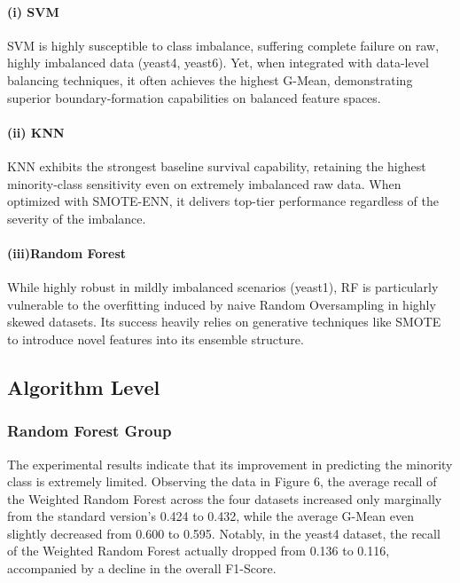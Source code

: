 \documentclass[sigconf]{acmart}
\begin{document}
\paragraph{(i) SVM}
SVM is highly susceptible to class imbalance, suffering complete failure on raw, highly imbalanced data (yeast4, yeast6). Yet, when integrated with data-level balancing techniques, it often achieves the highest G-Mean, demonstrating superior boundary-formation capabilities on balanced feature spaces. 

\paragraph{(ii) KNN}
KNN exhibits the strongest baseline survival capability, retaining the highest minority-class sensitivity even on extremely imbalanced raw data. When optimized with SMOTE-ENN, it delivers top-tier performance regardless of the severity of the imbalance. 

\paragraph{(iii)Random Forest}
While highly robust in mildly imbalanced scenarios (yeast1), RF is particularly vulnerable to the overfitting induced by naive Random Oversampling in highly skewed datasets. Its success heavily relies on generative techniques like SMOTE to introduce novel features into its ensemble structure. 



\subsection{Algorithm Level}

\subsubsection{Random Forest Group}
The experimental results indicate that its improvement in predicting the minority class is extremely limited. Observing the data in Figure 6, the average recall of the Weighted Random Forest across the four datasets increased only marginally from the standard version's 0.424 to 0.432, while the average G-Mean even slightly decreased from 0.600 to 0.595. Notably, in the yeast4 dataset, the recall of the Weighted Random Forest actually dropped from 0.136 to 0.116, accompanied by a decline in the overall F1-Score. 
\end{document}
